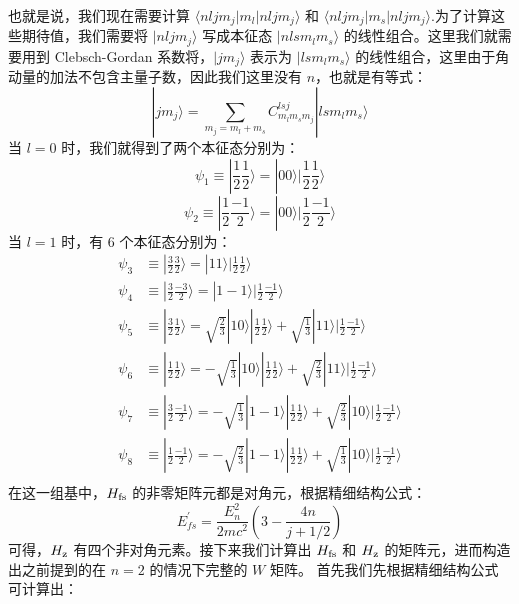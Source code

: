 也就是说，我们现在需要计算 $\langle nljm_j|m_l|nljm_j\rangle$ 和 $\langle nljm_j|m_s|nljm_j\rangle$.为了计算这些期待值，我们需要将 $|nljm_j\rangle$ 写成本征态 $|nlsm_lm_s\rangle$ 的线性组合。这里我们就需要用到 Clebsch-Gordan 系数将，$|jm_j\rangle$ 表示为 $|lsm_lm_s\rangle$ 的线性组合，这里由于角动量的加法不包含主量子数，因此我们这里没有 $n$，也就是有等式：
\begin{equation}
|jm_j\rangle = \sum_{m_j=m_l+m_s}C^{lsj}_{m_lm_sm_j}|lsm_lm_s\rangle
\end{equation}
当 $l=0$ 时，我们就得到了两个本征态分别为：
\begin{equation}
\psi_1\equiv|\frac{1}{2}\frac{1}{2}\rangle=|00\rangle|\frac{1}{2}\frac{1}{2}\rangle
\end{equation}
\begin{equation}
\psi_2\equiv|\frac{1}{2}\frac{-1}{2}\rangle=|00\rangle|\frac{1}{2}\frac{-1}{2}\rangle
\end{equation}
当 $l=1$ 时，有 $6$ 个本征态分别为：
\begin{align}
\psi_3&\equiv|\frac{3}{2}\frac{3}{2}\rangle=|11\rangle|\frac{1}{2}\frac{1}{2}\rangle\\
\psi_4&\equiv|\frac{3}{2}\frac{-3}{2}\rangle=|1-1\rangle|\frac{1}{2}\frac{-1}{2}\rangle\\
\psi_5&\equiv|\frac{3}{2}\frac{1}{2}\rangle=\sqrt{\frac{2}{3}}|10\rangle|\frac{1}{2}\frac{1}{2}\rangle+\sqrt{\frac{1}{3}}|11\rangle|\frac{1}{2}\frac{-1}{2}\rangle\\
\psi_6&\equiv|\frac{1}{2}\frac{1}{2}\rangle=-\sqrt{\frac{1}{3}}|10\rangle|\frac{1}{2}\frac{1}{2}\rangle+\sqrt{\frac{2}{3}}|11\rangle|\frac{1}{2}\frac{-1}{2}\rangle\\
\psi_7&\equiv|\frac{3}{2}\frac{-1}{2}\rangle=-\sqrt{\frac{1}{3}}|1-1\rangle|\frac{1}{2}\frac{1}{2}\rangle+\sqrt{\frac{2}{3}}|10\rangle|\frac{1}{2}\frac{-1}{2}\rangle\\
\psi_8&\equiv|\frac{1}{2}\frac{-1}{2}\rangle=-\sqrt{\frac{2}{3}}|1-1\rangle|\frac{1}{2}\frac{1}{2}\rangle+\sqrt{\frac{1}{3}}|10\rangle|\frac{1}{2}\frac{-1}{2}\rangle\\
\end{align}
在这一组基中，$H_{\rm{fs}}$ 的非零矩阵元都是对角元，根据精细结构公式：
\begin{equation}
E_{fs}^{'}=\frac{E_n^2}{2mc^2}\left(3-\frac{4n}{j+1/2}\right)
\end{equation}
可得，$H_{\rm{z}}$ 有四个非对角元素。接下来我们计算出 $H_{\rm{fs}}$ 和 $H_{\rm{z}}$ 的矩阵元，进而构造出之前提到的在 $n=2$ 的情况下完整的 $W$ 矩阵。 首先我们先根据精细结构公式可计算出：
